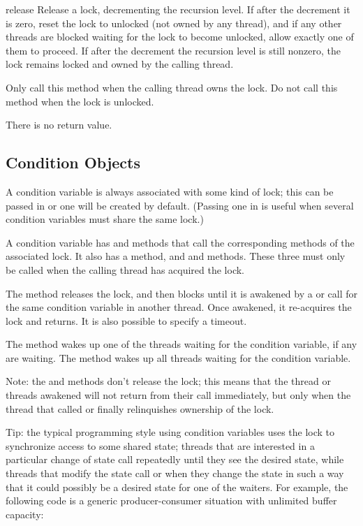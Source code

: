 \begin{methoddesc}{release}{}
Release a lock, decrementing the recursion level.  If after the
decrement it is zero, reset the lock to unlocked (not owned by any
thread), and if any other threads are blocked waiting for the lock to
become unlocked, allow exactly one of them to proceed.  If after the
decrement the recursion level is still nonzero, the lock remains
locked and owned by the calling thread.

Only call this method when the calling thread owns the lock.
Do not call this method when the lock is unlocked.

There is no return value.
\end{methoddesc}


\subsection{Condition Objects \label{condition-objects}}

A condition variable is always associated with some kind of lock;
this can be passed in or one will be created by default.  (Passing
one in is useful when several condition variables must share the
same lock.)

A condition variable has  and 
methods that call the corresponding methods of the associated lock.
It also has a  method, and  and
 methods.  These three must only be called when
the calling thread has acquired the lock.

The  method releases the lock, and then blocks until it
is awakened by a  or  call for
the same condition variable in another thread.  Once awakened, it
re-acquires the lock and returns.  It is also possible to specify a
timeout.

The  method wakes up one of the threads waiting for
the condition variable, if any are waiting.  The 
method wakes up all threads waiting for the condition variable.

Note: the  and  methods don't
release the lock; this means that the thread or threads awakened will
not return from their  call immediately, but only when
the thread that called  or 
finally relinquishes ownership of the lock.

Tip: the typical programming style using condition variables uses the
lock to synchronize access to some shared state; threads that are
interested in a particular change of state call 
repeatedly until they see the desired state, while threads that modify
the state call  or  when they
change the state in such a way that it could possibly be a desired
state for one of the waiters.  For example, the following code is a
generic producer-consumer situation with unlimited buffer capacity:

